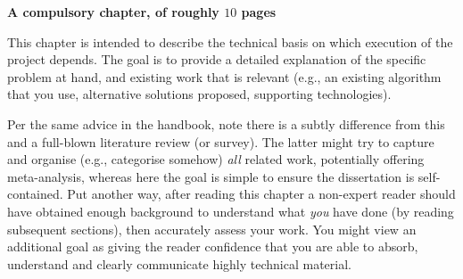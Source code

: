 {\bf A compulsory chapter, of roughly $10$ pages}
\vspace{1cm}

\noindent
This chapter is intended to describe the technical basis on which execution
of the project depends.  The goal is to provide a detailed explanation of
the specific problem at hand, and existing work that is relevant (e.g., an
existing algorithm that you use, alternative solutions proposed, supporting
technologies).

Per the same advice in the handbook, note there is a subtly difference from
this and a full-blown literature review (or survey).  The latter might try
to capture and organise (e.g., categorise somehow) {\em all} related work,
potentially offering meta-analysis, whereas here the goal is simple to
ensure the dissertation is self-contained.  Put another way, after reading
this chapter a non-expert reader should have obtained enough background to
understand what {\em you} have done (by reading subsequent sections), then
accurately assess your work.  You might view an additional goal as giving
the reader confidence that you are able to absorb, understand and clearly
communicate highly technical material.
